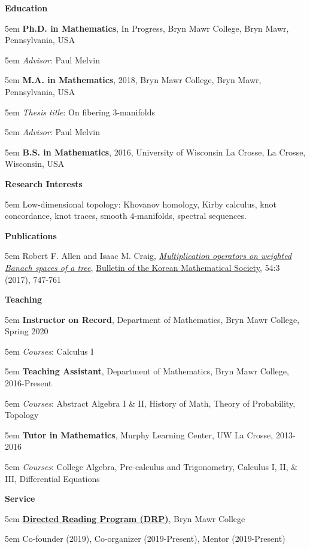 \documentclass[10.5pt]{article}
\newcommand{\sectitle}[1]{{\large \textbf{#1}}\vspace{.5em}}
\newcommand{\itemreg}[1]{\begin{addmargin}[0em]{5em} #1 \end{addmargin}}
\newcommand{\itemregind}[1]{\begin{addmargin}[1em]{5em} #1 \end{addmargin}}
\begin{document}
\null
\vskip27.5pt


\sectitle{Education}

\itemreg{\textbf{Ph.D. in Mathematics}, In Progress, Bryn Mawr College, Bryn Mawr, Pennsylvania, USA}
	\itemregind{\textit{Advisor}: Paul Melvin}
	\vspace{.25em}
\itemreg{\textbf{M.A. in Mathematics}, 2018, Bryn Mawr College, Bryn Mawr, Pennsylvania, USA}
	\itemregind{\textit{Thesis title}: On fibering 3-manifolds}
	\itemregind{\textit{Advisor}: Paul Melvin}
	\vspace{.25em}
\itemreg{\textbf{B.S. in Mathematics}, 2016, University of Wisconsin La Crosse, La Crosse, Wisconsin, USA}
\vspace{2em}



\sectitle{Research Interests}

\itemreg{Low-dimensional topology: Khovanov homology, Kirby calculus, knot concordance, knot traces, smooth $4$-manifolds, spectral sequences.}
\vspace{2em}



\sectitle{Publications}

\itemreg{Robert F. Allen and Isaac M. Craig, \textit{\href{https://imsundberg.github.io/files/mult_op.pdf}{Multiplication operators on weighted Banach spaces of a tree}}, \href{http://bkms.kms.or.kr/}{Bulletin of the Korean Mathematical Society}, 54:3 (2017), 747-761}
\vspace{2em}



\sectitle{Teaching}

\itemreg{\textbf{Instructor on Record}, Department of Mathematics, Bryn Mawr College, Spring 2020}
	\itemregind{\textit{Courses}: Calculus I}
	\vspace{.25em}
\itemreg{\textbf{Teaching Assistant}, Department of Mathematics, Bryn Mawr College, 2016-Present}
	\itemregind{\textit{Courses}: Abstract Algebra I \& II, History of Math, Theory of Probability, Topology}
	\vspace{.25em}
\itemreg{\textbf{Tutor in Mathematics}, Murphy Learning Center, UW La Crosse, 2013-2016}
	\itemregind{\textit{Courses}: College Algebra, Pre-calculus and Trigonometry, Calculus I, II, \& III, Differential Equations}
\vspace{2em}



\sectitle{Service}

\itemreg{\textbf{\href{https://www.brynmawr.edu/math/directed-reading-program}{Directed Reading Program (DRP)}}, Bryn Mawr College}
	\itemregind{Co-founder (2019), Co-organizer (2019-Present), Mentor (2019-Present)}
	\vspace{.25em}
	
\end{document}
